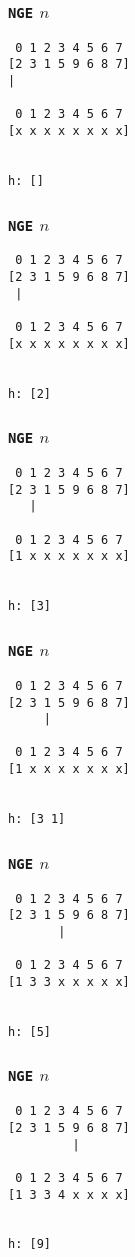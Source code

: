 \documentclass{beamer}
\begin{document}
\begin{frame}[fragile]
	\frametitle{\texttt{NGE} $n$}
\begin{verbatim}
 0 1 2 3 4 5 6 7
[2 3 1 5 9 6 8 7]
|

 0 1 2 3 4 5 6 7
[x x x x x x x x]


h: []
\end{verbatim}
\end{frame}
\addtocounter{framenumber}{-1}

\begin{frame}[fragile]
	\frametitle{\texttt{NGE} $n$}
\begin{verbatim}
 0 1 2 3 4 5 6 7
[2 3 1 5 9 6 8 7]
 |

 0 1 2 3 4 5 6 7
[x x x x x x x x]


h: [2]
\end{verbatim}
\end{frame}
\addtocounter{framenumber}{-1}

\begin{frame}[fragile]
	\frametitle{\texttt{NGE} $n$}
\begin{verbatim}
 0 1 2 3 4 5 6 7
[2 3 1 5 9 6 8 7]
   |

 0 1 2 3 4 5 6 7
[1 x x x x x x x]


h: [3]
\end{verbatim}
\end{frame}
\addtocounter{framenumber}{-1}

\begin{frame}[fragile]
	\frametitle{\texttt{NGE} $n$}
\begin{verbatim}
 0 1 2 3 4 5 6 7
[2 3 1 5 9 6 8 7]
     |

 0 1 2 3 4 5 6 7
[1 x x x x x x x]


h: [3 1]
\end{verbatim}
\end{frame}
\addtocounter{framenumber}{-1}

\begin{frame}[fragile]
	\frametitle{\texttt{NGE} $n$}
\begin{verbatim}
 0 1 2 3 4 5 6 7
[2 3 1 5 9 6 8 7]
       |

 0 1 2 3 4 5 6 7
[1 3 3 x x x x x]


h: [5]
\end{verbatim}
\end{frame}
\addtocounter{framenumber}{-1}

\begin{frame}[fragile]
	\frametitle{\texttt{NGE} $n$}
\begin{verbatim}
 0 1 2 3 4 5 6 7
[2 3 1 5 9 6 8 7]
         |

 0 1 2 3 4 5 6 7
[1 3 3 4 x x x x]


h: [9]
\end{verbatim}
\end{frame}
\addtocounter{framenumber}{-1}
\end{document}
